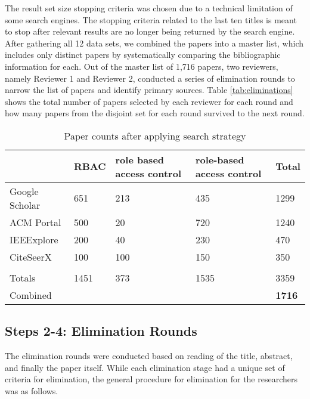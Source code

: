 The result set size stopping criteria was chosen due to a technical limitation of some search engines.  The stopping criteria related to the last ten titles is meant to stop after relevant results are no longer being returned by the search engine.  After gathering all 12 data sets, we combined the papers into a master list, which includes only distinct papers by systematically comparing the bibliographic information for each.
Out of the master list of 1,716 papers, two reviewers, namely Reviewer 1 and Reviewer 2, conducted a series of elimination rounds to narrow the list of papers and identify primary sources. Table \ref{tab:eliminations} shows the total number of papers selected by each reviewer for each round and how many papers from the disjoint set for each round survived to the next round.

\begin{table}
\centering
\caption{Paper counts after applying search strategy}
\begin{tabular}{|p{3.5cm}|p{1.25cm}|p{4.25cm}|p{4.25cm}|p{1cm}|}

\hline
 & 
\textbf{RBAC} & 
\textbf{role based access control} & 
\textbf{role-based access control} & 
\textbf{Total}
\\\hline

Google Scholar & 651 & 213 & 435 & 1299 \\\hline
ACM Portal & 500 & 20 & 720 & 1240 \\\hline
IEEExplore & 200 & 40 & 230 & 470 \\\hline
CiteSeerX & 100 & 100 & 150 & 350 \\\hline
 &  &  &  & \\\hline
Totals & 1451 & 373 & 1535 & 3359 \\\hline
Combined &  &  &  & \textbf{1716} \\\hline

\end{tabular}
\label{tab:search_results}
\end{table}

\subsection{Steps 2-4: Elimination Rounds}

The elimination rounds were conducted based on reading of the title, abstract, and finally the paper itself.  While each elimination stage had a unique set of criteria for elimination, the general procedure for elimination for the researchers was as follows.

